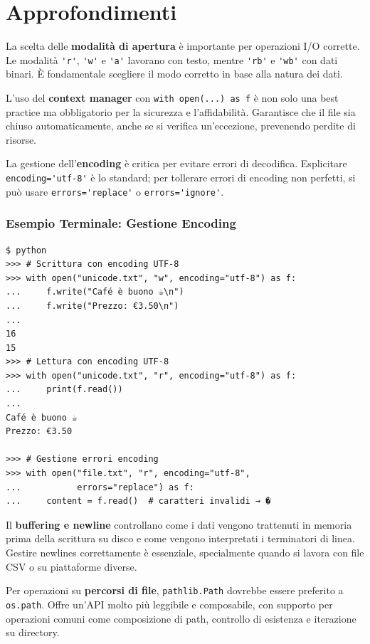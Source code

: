 \section{Approfondimenti}
\begin{tcolorbox}[title=Spiegazioni dettagliate]
La scelta delle \textbf{modalità di apertura} è importante per operazioni I/O corrette. Le modalità \verb|'r'|, \verb|'w'| e \verb|'a'| lavorano con testo, mentre \verb|'rb'| e \verb|'wb'| con dati binari. È fondamentale scegliere il modo corretto in base alla natura dei dati.

L'uso del \textbf{context manager} con \verb|with open(...) as f| è non solo una best practice ma obbligatorio per la sicurezza e l'affidabilità. Garantisce che il file sia chiuso automaticamente, anche se si verifica un'eccezione, prevenendo perdite di risorse.

La gestione dell'\textbf{encoding} è critica per evitare errori di decodifica. Esplicitare \verb|encoding='utf-8'| è lo standard; per tollerare errori di encoding non perfetti, si può usare \verb|errors='replace'| o \verb|errors='ignore'|.

\subsubsection{Esempio Terminale: Gestione Encoding}
\begin{tcolorbox}[title={\faTerminal\ Output}, colback=black!5, colframe=black!70]
\begin{lstlisting}[style=python]
$ python
>>> # Scrittura con encoding UTF-8
>>> with open("unicode.txt", "w", encoding="utf-8") as f:
...     f.write("Café è buono ☕\n")
...     f.write("Prezzo: €3.50\n")
...
16
15
>>> # Lettura con encoding UTF-8
>>> with open("unicode.txt", "r", encoding="utf-8") as f:
...     print(f.read())
...
Café è buono ☕
Prezzo: €3.50

>>> # Gestione errori encoding
>>> with open("file.txt", "r", encoding="utf-8",
...           errors="replace") as f:
...     content = f.read()  # caratteri invalidi → �
\end{lstlisting}
\end{tcolorbox}

Il \textbf{buffering e newline} controllano come i dati vengono trattenuti in memoria prima della scrittura su disco e come vengono interpretati i terminatori di linea. Gestire newlines correttamente è essenziale, specialmente quando si lavora con file CSV o su piattaforme diverse.

Per operazioni su \textbf{percorsi di file}, \verb|pathlib.Path| dovrebbe essere preferito a \verb|os.path|. Offre un'API molto più leggibile e composabile, con supporto per operazioni comuni come composizione di path, controllo di esistenza e iterazione su directory.
\end{tcolorbox}

